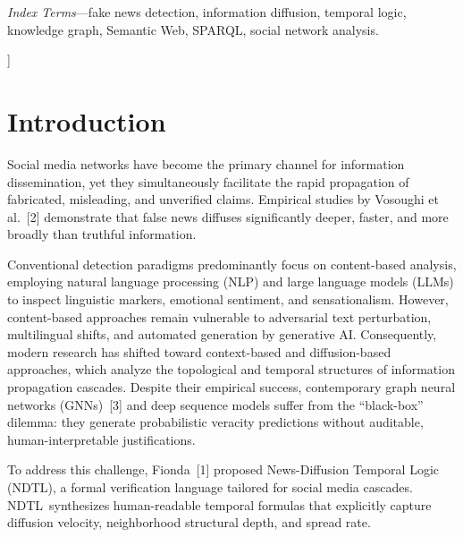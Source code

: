 \documentclass[10pt,twocolumn,a4paper]{article}
\newcommand{\NDTL}{\textsc{NDTL}}
\begin{document}
{\begin{@twocolumnfalse}
\begin{center}
\begin{minipage}{0.92\textwidth}
\vspace{4pt}
\noindent\textit{Index Terms}---fake news detection, information diffusion, temporal logic, knowledge graph, Semantic Web, SPARQL, social network analysis.
\end{minipage}
\end{center}
\vspace{10pt}
\end{@twocolumnfalse}
}]
\makeatother
 
\section{Introduction}
Social media networks have become the primary channel for information dissemination, yet they simultaneously facilitate the rapid propagation of fabricated, misleading, and unverified claims. Empirical studies by Vosoughi et al.~[2] demonstrate that false news diffuses significantly deeper, faster, and more broadly than truthful information.
 
Conventional detection paradigms predominantly focus on content-based analysis, employing natural language processing (NLP) and large language models (LLMs) to inspect linguistic markers, emotional sentiment, and sensationalism. However, content-based approaches remain vulnerable to adversarial text perturbation, multilingual shifts, and automated generation by generative AI. Consequently, modern research has shifted toward context-based and diffusion-based approaches, which analyze the topological and temporal structures of information propagation cascades. Despite their empirical success, contemporary graph neural networks (GNNs)~[3] and deep sequence models suffer from the ``black-box'' dilemma: they generate probabilistic veracity predictions without auditable, human-interpretable justifications.
 
To address this challenge, Fionda~[1] proposed News-Diffusion Temporal Logic (\NDTL), a formal verification language tailored for social media cascades. \NDTL\ synthesizes human-readable temporal formulas that explicitly capture diffusion velocity, neighborhood structural depth, and spread rate.
 
\end{document}
